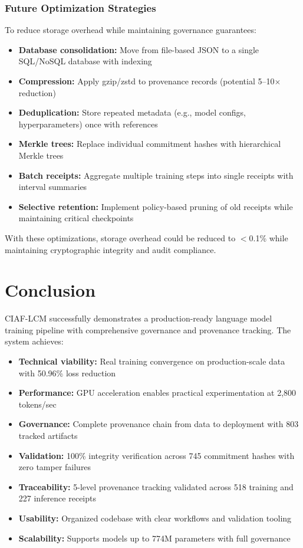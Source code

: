 \documentclass[11pt,a4paper]{article}
\begin{document}
\subsubsection{Future Optimization Strategies}

To reduce storage overhead while maintaining governance guarantees:

\begin{itemize}
    \item \textbf{Database consolidation:} Move from file-based JSON to a single SQL/NoSQL database with indexing
    \item \textbf{Compression:} Apply gzip/zstd to provenance records (potential 5--10$\times$ reduction)
    \item \textbf{Deduplication:} Store repeated metadata (e.g., model configs, hyperparameters) once with references
    \item \textbf{Merkle trees:} Replace individual commitment hashes with hierarchical Merkle trees
    \item \textbf{Batch receipts:} Aggregate multiple training steps into single receipts with interval summaries
    \item \textbf{Selective retention:} Implement policy-based pruning of old receipts while maintaining critical checkpoints
\end{itemize}

With these optimizations, storage overhead could be reduced to $<$0.1\% while maintaining cryptographic integrity and audit compliance.

\section{Conclusion}

CIAF-LCM successfully demonstrates a production-ready language model training pipeline with comprehensive governance and provenance tracking. The system achieves:

\begin{itemize}
    \item \textbf{Technical viability:} Real training convergence on production-scale data with 50.96\% loss reduction
    \item \textbf{Performance:} GPU acceleration enables practical experimentation at 2,800 tokens/sec
    \item \textbf{Governance:} Complete provenance chain from data to deployment with 803 tracked artifacts
    \item \textbf{Validation:} 100\% integrity verification across 745 commitment hashes with zero tamper failures
    \item \textbf{Traceability:} 5-level provenance tracking validated across 518 training and 227 inference receipts
    \item \textbf{Usability:} Organized codebase with clear workflows and validation tooling
    \item \textbf{Scalability:} Supports models up to 774M parameters with full governance
\end{itemize}
\end{document}
